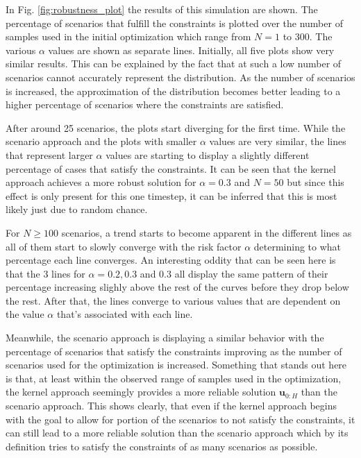 In Fig. \ref{fig:robustness_plot} the results of this simulation are shown. The percentage of scenarios that fulfill the constraints is plotted over the number of samples used in the initial optimization which range from $N = 1$ to 300. The various $\alpha$ values are shown as separate lines. Initially, all five plots show very similar results. This can be explained by the fact that at such a low number of scenarios cannot accurately represent the distribution. As the number of scenarios is increased, the approximation of the distribution becomes better leading to a higher percentage of scenarios where the constraints are satisfied.

After around 25 scenarios, the plots start diverging for the first time. While the scenario approach and the plots with smaller $\alpha$ values are very similar, the lines that represent larger $\alpha$ values are starting to display a slightly different percentage of cases that satisfy the constraints. It can be seen that the kernel approach achieves a more robust solution for $\alpha = 0.3$ and $N = 50$ but since this effect is only present for this one timestep, it can be inferred that this is most likely just due to random chance.

For $N \geq 100$ scenarios, a trend starts to become apparent in the different lines as all of them start to slowly converge with the risk factor $\alpha$ determining to what percentage each line converges. An interesting oddity that can be seen here is that the 3 lines for $\alpha = 0.2, 0.3$ and $0.3$ all display the same pattern of their percentage increasing slighly above the rest of the curves before they drop below the rest. After that, the lines converge to various values that are dependent on the value $\alpha$ that's associated with each line.

Meanwhile, the scenario approach is displaying a similar behavior with the percentage of scenarios that satisfy the constraints improving as the number of scenarios used for the optimization is increased. Something that stands out here is that, at least within the observed range of samples used in the optimization, the kernel approach seemingly provides a more reliable solution $\boldsymbol{u}_{0:H}$ than the scenario approach. This shows clearly, that even if the kernel approach begins with the goal to allow for portion of the scenarios to not satisfy the constraints, it can still lead to a more reliable solution than the scenario approach which by its definition tries to satisfy the constraints of as many scenarios as possible.

